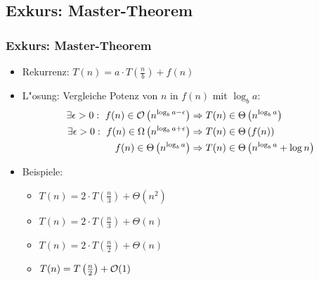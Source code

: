 \subsection{Exkurs: Master-Theorem}
\begin{frame}
  \frametitle{Exkurs: Master-Theorem}
  \begin{itemize}
  \item Rekurrenz: $T(n) = a\cdot T\left(\frac{n}{b}\right) + f(n)$
  \item L"osung: Vergleiche Potenz von $n$ in $f(n)$ mit $\log_b a$:
    \begin{align}
      \exists\epsilon > 0: \ f(n) \in \mathcal{O}\left(n^{\log_b a - \epsilon}\right) &\Rightarrow
             T(n) \in \Theta\left(n^{\log_ba}\right) \\
      \exists\epsilon > 0: \ f(n) \in \Omega\left(n^{\log_b a + \epsilon}\right) &\Rightarrow
             T(n) \in \Theta\left(f(n)\right) \\
      f(n) \in \Theta\left(n^{\log_b a}\right) &\Rightarrow
             T(n) \in \Theta\left(n^{\log_b a} + \log n\right)
    \end{align}
  \item Beispiele:
    \begin{itemize} \itemsep 1em
    \item $T(n) = 2\cdot T\left(\frac{n}{3}\right) + \Theta(n^2)$
    \item $T(n) = 2\cdot T\left(\frac{n}{3}\right) + \Theta(n)$
    \item $T(n) = 2\cdot T\left(\frac{n}{2}\right) + \Theta(n)$
    \item $T(n) = T\left(\frac{n}{2}\right) + \mathcal{O}(1)$
    \end{itemize}
  \end{itemize}
\end{frame}


